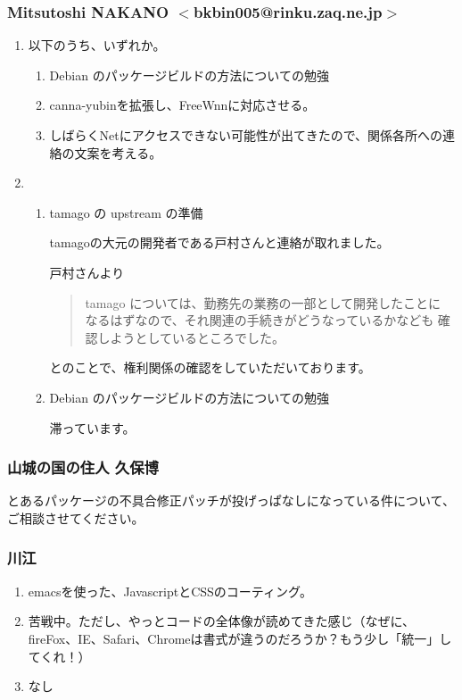 \documentclass[cjk,dvipdfmx,10pt,compress,%
hyperref={bookmarks=true,bookmarksnumbered=true,bookmarksopen=false,%
colorlinks=false,%
pdftitle={第 88 回 関西 Debian 勉強会},%
pdfauthor={倉敷・のがた・佐々木・かわだ・八津尾},%
pdfsubject={資料},%
}]{beamer}
\begin{document}
\begin{frame}
  \frametitle{ Mitsutoshi NAKANO $<$bkbin005@rinku.zaq.ne.jp$>$ }
  \begin{enumerate}
  \item 以下のうち、いずれか。
    \begin{enumerate}
    \item Debian のパッケージビルドの方法についての勉強
    \item canna-yubinを拡張し、FreeWnnに対応させる。
    \item しばらくNetにアクセスできない可能性が出てきたので、関係各所への連絡の文案を考える。
    \end{enumerate}
  \item
    \begin{enumerate}
    \item tamago の upstream の準備

      tamagoの大元の開発者である戸村さんと連絡が取れました。

      戸村さんより

      \begin{quote}
      tamago については、勤務先の業務の一部として開発したことに
      なるはずなので、それ関連の手続きがどうなっているかなども
      確認しようとしているところでした。
      \end{quote}

      とのことで、権利関係の確認をしていただいております。

    \item Debian のパッケージビルドの方法についての勉強

      滞っています。
    \end{enumerate}
  \end{enumerate}
\end{frame}

\begin{frame}
  \frametitle{ 山城の国の住人 久保博 }
とあるパッケージの不具合修正パッチが投げっぱなしになっている件について、ご相談させてください。
\end{frame}

\begin{frame}
  \frametitle{ 川江 }
  \begin{enumerate}
  \item emacsを使った、JavascriptとCSSのコーティング。
  \item 苦戦中。ただし、やっとコードの全体像が読めてきた感じ（なぜに、fireFox、IE、Safari、Chromeは書式が違うのだろうか？もう少し「統一」してくれ！）
  \item なし
  \end{enumerate}
\end{frame}
\end{document}

